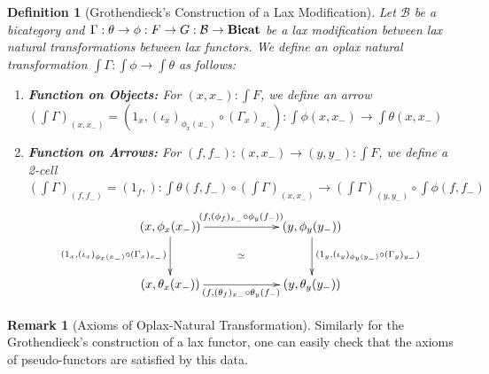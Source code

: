 \documentclass{article}
\numberwithin{equation}{section}
\theoremstyle{definition}
\newtheorem{remark}[equation]{Remark}
\theoremstyle{plain}
\newtheorem{definition}[equation]{Definition}
\newcommand{\Bicat}{\textnormal{\textbf{Bicat}}}
\begin{document}
\begin{definition}[Grothendieck's Construction of a Lax Modification] Let $\mathcal{B}$ be a bicategory and $\Gamma: \theta \to \phi: F \to G: \mathcal{B} \to \Bicat$ be a lax modification between lax natural transformations between lax functors. We define an oplax natural transformation $\int \Gamma: \int \phi \to \int \theta$ as follows:
	\begin{enumerate}
		\item \textbf{Function on Objects:} For $(x,x_-):\int F$, we define an arrow $(\int \Gamma)_{(x, x_-)} = (1_x, (\iota_x)_{\phi_x(x_-)} \circ (\Gamma_x)_{x_-}) : \int \phi(x,x_-) \to \int \theta (x,x_-)$
		\item \textbf{Function on Arrows:} For $(f,f_-):(x, x_-) \to (y, y_-):\int F$, we define a 2-cell $(\int \Gamma)_{(f, f_-)} = (1_f,): \int \theta(f,f_-) \circ (\int \Gamma)_{(x, x_-)} \to (\int \Gamma)_{(y, y_-)} \circ \int \phi(f,f_-)$
		\[\xymatrix@R=3em@C=6em{
			(x,\phi_x(x_-)) \ar@{}[dr]|{\simeq} \ar[d]_{(1_x,(\iota_x)_{\phi_x(x_-)} \circ (\Gamma_x)_{x_-})} \ar[r]^{(f, (\phi_f)_{x_-} \circ \phi_y(f_-))} & (y,\phi_y(y_-)) \ar[d]^{(1_y,(\iota_y)_{\phi_y(y_-)} \circ (\Gamma_y)_{y_-})}\\
			(x,\theta_x(x_-)) \ar[r]_{(f, (\theta_f)_{x_-} \circ \theta_y(f_-)} & (y,\theta_y(y_-))
		}\]
	\end{enumerate}
\end{definition}

\begin{remark}[Axioms of Oplax-Natural Transformation] Similarly for the Grothendieck's construction of a lax functor, one can easily check that the axioms of pseudo-functors are satisfied by this data.
\end{remark}
\end{document}

